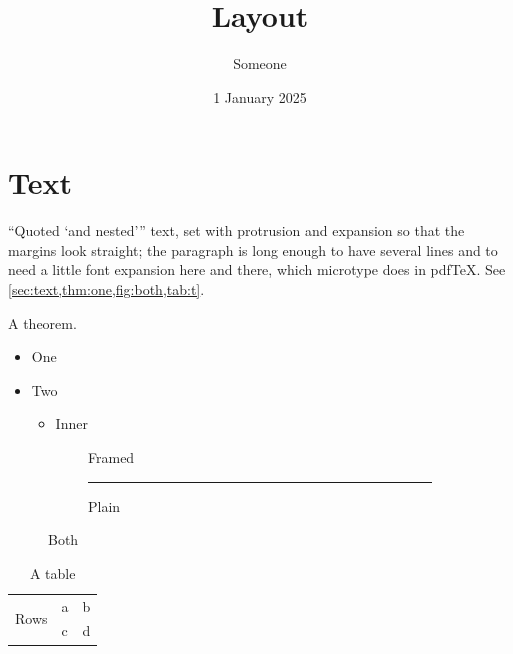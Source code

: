 \documentclass[12pt]{article}
\title{Layout}\author{Someone}\date{1 January 2025}
\begin{document}
\maketitle
\section{Text}\label{sec:text}
\begin{onehalfspace}
\enquote{Quoted \enquote{and nested}} text, set with protrusion and expansion so that the margins look straight; the paragraph is long enough to have several lines and to need a little font expansion here and there, which microtype does in pdfTeX. See \cref{sec:text,thm:one,fig:both,tab:t}.
\end{onehalfspace}
\begin{theorem}\label{thm:one}A theorem.\end{theorem}
\begin{itemize}\item One\item Two\begin{itemize}\item Inner\end{itemize}\end{itemize}
\begin{figure}[H]\centering
\begin{subfigure}{0.45\textwidth}\centering{}\caption{Framed}\end{subfigure}
\begin{subfigure}{0.45\textwidth}\centering\rule{2cm}{1cm}\caption{Plain}\end{subfigure}
\caption{Both}\label{fig:both}\end{figure}
\begin{table}[H]\centering\begin{tabular}{lll}\toprule\multirow{2}{*}{Rows} & a & b\\ & c & d\\\bottomrule\end{tabular}\caption{A table}\label{tab:t}\end{table}
\end{document}
